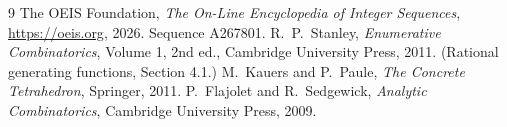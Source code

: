 \documentclass[11pt,a4paper]{article}
\theoremstyle{plain}
\theoremstyle{definition}
\begin{document}
\begin{thebibliography}{9}
 The OEIS Foundation, \emph{The On-Line Encyclopedia of Integer
Sequences}, \url{https://oeis.org}, 2026. Sequence A267801.
 R.~P.~Stanley, \emph{Enumerative Combinatorics}, Volume 1, 2nd ed.,
Cambridge University Press, 2011. (Rational generating functions, Section 4.1.)
 M.~Kauers and P.~Paule, \emph{The Concrete Tetrahedron}, Springer, 2011.
 P.~Flajolet and R.~Sedgewick, \emph{Analytic Combinatorics}, Cambridge
University Press, 2009.
\end{thebibliography}
\end{document}
